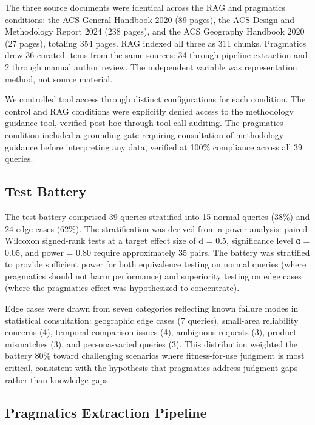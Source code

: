 \documentclass[
  11pt,
  letterpaper,
]{article}
\begin{document}
The three source documents were identical across the RAG and pragmatics
conditions: the ACS General Handbook 2020 (89 pages), the ACS Design and
Methodology Report 2024 (238 pages), and the ACS Geography Handbook 2020
(27 pages), totaling 354 pages. RAG indexed all three as 311 chunks.
Pragmatics drew 36 curated items from the same sources: 34 through
pipeline extraction and 2 through manual author review. The independent
variable was representation method, not source material.

We controlled tool access through distinct configurations for each
condition. The control and RAG conditions were explicitly denied access
to the methodology guidance tool, verified post-hoc through tool call
auditing. The pragmatics condition included a grounding gate requiring
consultation of methodology guidance before interpreting any data,
verified at 100\% compliance across all 39 queries.

\subsection{Test Battery}\label{test-battery}

The test battery comprised 39 queries stratified into 15 normal queries
(38\%) and 24 edge cases (62\%). The stratification was derived from a
power analysis: paired Wilcoxon signed-rank tests at a target effect
size of d = 0.5, significance level α = 0.05, and power = 0.80 require
approximately 35 pairs. The battery was stratified to provide sufficient
power for both equivalence testing on normal queries (where pragmatics
should not harm performance) and superiority testing on edge cases
(where the pragmatics effect was hypothesized to concentrate).

Edge cases were drawn from seven categories reflecting known failure
modes in statistical consultation: geographic edge cases (7 queries),
small-area reliability concerns (4), temporal comparison issues (4),
ambiguous requests (3), product mismatches (3), and persona-varied
queries (3). This distribution weighted the battery 80\% toward
challenging scenarios where fitness-for-use judgment is most critical,
consistent with the hypothesis that pragmatics address judgment gaps
rather than knowledge gaps.

\subsection{Pragmatics Extraction
Pipeline}\label{pragmatics-extraction-pipeline}
\end{document}
